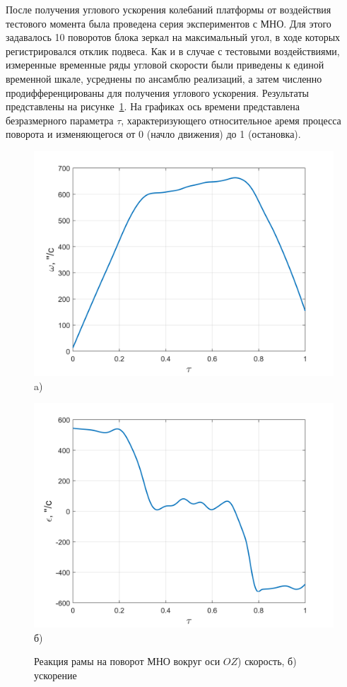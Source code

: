 После получения углового ускорения колебаний платформы от воздействия тестового момента была проведена серия экспериментов с МНО. Для этого задавалось 10 поворотов блока зеркал на максимальный угол, в ходе которых регистрировался отклик подвеса. Как и в случае с тестовыми воздействиями, измеренные временные ряды угловой скорости были приведены к единой временной шкале, усреднены по ансамблю реализаций, а затем численно продифференцированы для получения углового ускорения. Результаты представлены на рисунке~\cref{fig:oz-gyro}. На графиках ось времени представлена безразмерного параметра $\tau$, характеризующего относительное аремя процесса поворота и изменяющегося от 0 (начло движения) до 1 (остановка).

\begin{figure}[!h]
	\begin{minipage}[b][][b]{0.49\linewidth}\centering
		\includegraphics[width=0.9\linewidth]{matlab/img/oz-gyro.png} \\ a)
	\end{minipage}
	\hfill
	\begin{minipage}[b][][b]{0.49\linewidth}\centering
		\includegraphics[width=0.9\linewidth]{matlab/img/oz-gyro-acc.png} \\ б)
	\end{minipage}
	\caption{Реакция рамы на поворот МНО вокруг оси $OZ$) скорость, б) ускорение }
	\label{fig:oz-gyro}
\end{figure}

